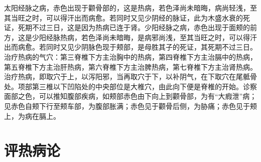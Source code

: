 \documentclass[a4paper,12pt,UTF8,twoside]{ctexbook}
\begin{document}
太阳经脉之病，赤色出现于颧骨部的，这是热病，若色泽尚未暗晦，病尚轻浅，至其当旺之时，可以得汗出而病愈。若同时又见少阴经的脉证，此为木盛水衰的死证，死期不过三日，这是因为热病已连于肾。少阳经脉之病，赤色出现于面颊的前方，这是少阳经脉热病，若色泽尚未暗晦，是病邪尚浅，至其当旺之时，可以得汗出而病愈。若同时又见少阴脉色现于颊部，是母胜其子的死证，其死期不过三日。
治疗热病的气穴：第三脊椎下方主治胸中的热病，第四脊椎下方主治膈中的热病，第五脊椎下方主治肝热病，第六脊椎下方主治脾热病，第七脊椎下方主治肾热病。治疗热病，即取穴于上，以泻阳邪，当再取穴于下，以补阴气，在下取穴在尾骶骨处。项部第三椎以下凹陷处的中央部位是大椎穴，由此向下便是脊椎的开始。诊察面部之色，可以推知腹部疾病，如颊部赤色由下向上到颧骨部，为有“大瘕泄”病；见赤色自颊下行至颊车部，为腹部胀满；赤色见于颧骨后侧，为胁痛；赤色见于颊上，为病在膈上。

\chapter{评热病论}
\end{document}
